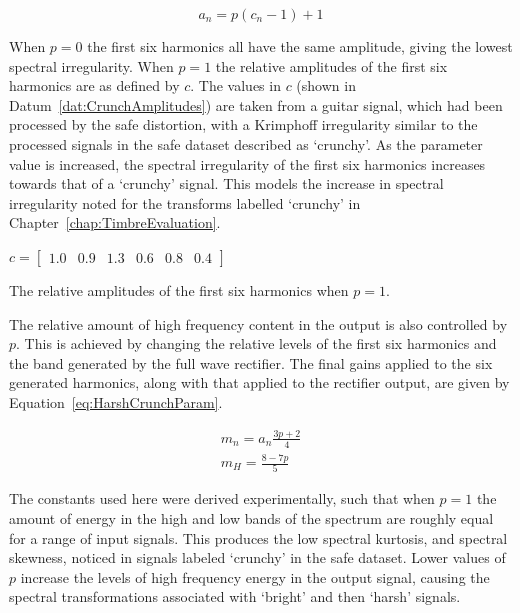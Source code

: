			\begin{equation}
				a_{n} = p(c_{n} - 1) + 1
				\label{eq:HarshCrunchAmps}
			\end{equation}

			When $p = 0$ the first six harmonics all have the same amplitude, giving the lowest spectral
			irregularity. When $p = 1$ the relative amplitudes of the first six harmonics are as defined by
			$c$.  The values in $c$ (shown in Datum~\ref{dat:CrunchAmplitudes}) are taken from a guitar signal,
			which had been processed by the \acrshort{safe} distortion, with a Krimphoff irregularity similar
			to the processed signals in the \acrshort{safe} dataset described as `crunchy'. As the parameter
			value is increased, the spectral irregularity of the first six harmonics increases towards that of
			a `crunchy' signal.  This models the increase in spectral irregularity noted for the transforms
			labelled `crunchy' in Chapter~\ref{chap:TimbreEvaluation}.

			\begin{datum}[h!]
				\centering
				$c = \begin{bmatrix}
					1.0 & 0.9 & 1.3 & 0.6 & 0.8 & 0.4
				     \end{bmatrix}$
				\caption{The relative amplitudes of the first six harmonics when $p = 1$.}
				\label{dat:CrunchAmplitudes}
			\end{datum}
			
			The relative amount of high frequency content in the output is also controlled by $p$. This is
			achieved by changing the relative levels of the first six harmonics and the band generated by the
			full wave rectifier. The final gains applied to the six generated harmonics, along with that
			applied to the rectifier output, are given by Equation~\ref{eq:HarshCrunchParam}.

			\begin{gather}
				m_{n} = a_{n}\frac{3p + 2}{4} \nonumber \\[0.6em]
				m_{H} = \frac{8 - 7p}{5}
				\label{eq:HarshCrunchParam}
			\end{gather}

			The constants used here were derived experimentally, such that when $p = 1$ the amount of energy in
			the high and low bands of the spectrum are roughly equal for a range of input signals. This
			produces the low spectral kurtosis, and spectral skewness, noticed in signals labeled `crunchy' in
			the \acrshort{safe} dataset. Lower values of $p$ increase the levels of high frequency energy in
			the output signal, causing the spectral transformations associated with `bright' and then `harsh'
			signals.

